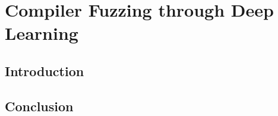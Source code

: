 \chapter{Compiler Fuzzing through Deep Learning}

\section{Introduction}

\lipsum[1-2]



\section{Conclusion}

\lipsum[1-2]
